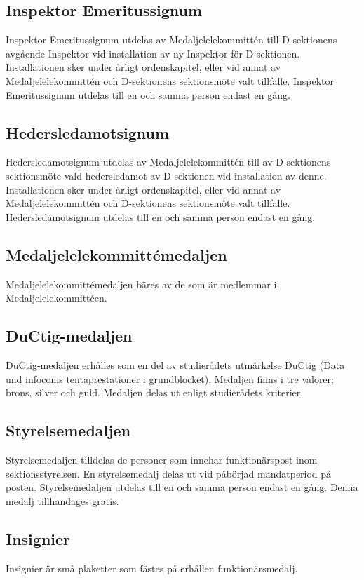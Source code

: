 \documentclass[pdfbookmarks,a4paper,11pt]{article}
\begin{document}
\subsection{Inspektor Emeritussignum}
Inspektor Emeritussignum utdelas av Medaljelelekommittén till D-sektionens avgående Inspektor vid installation av ny Inspektor för D-sektionen. Installationen sker under årligt ordenskapitel, eller vid annat av Medaljelelekommittén och D-sektionens sektionsmöte valt tillfälle. Inspektor Emeritussignum utdelas till en och samma person endast en gång.

\subsection{Hedersledamotsignum}
Hedersledamotsignum utdelas av Medaljelelekommittén till av D-sektionens sektionsmöte vald hedersledamot av D-sektionen vid installation av denne. Installationen sker under årligt ordenskapitel, eller vid annat av Medaljelelekommittén och D-sektionens sektionsmöte valt tillfälle. Hedersledamotsignum utdelas till en och samma person endast en gång.

\subsection{Medaljelelekommittémedaljen}
Medaljelelekommittémedaljen bäres av de som är medlemmar i Medaljelelekommittéen.

\subsection{DuCtig-medaljen}
DuCtig-medaljen erhålles som en del av studierådets utmärkelse DuCtig (Data und infocoms tentaprestationer i grundblocket). Medaljen finns i tre valörer; brons, silver och guld. Medaljen delas ut enligt studierådets kriterier.

\subsection{Styrelsemedaljen}
Styrelsemedaljen tilldelas de personer som innehar funktionärspost inom sektionsstyrelsen. En
styrelsemedalj delas ut vid påbörjad mandatperiod på posten. Styrelsemedaljen utdelas till en
och samma person endast en gång. Denna medalj tillhandages gratis.

\subsection{Insignier}
Insignier är små plaketter som fästes på erhållen funktionärsmedalj.
\end{document}
